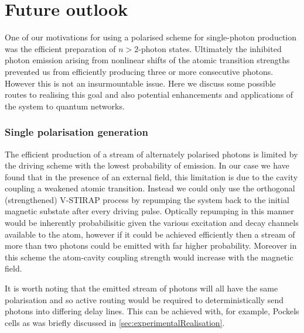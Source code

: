 \documentclass[../Thesis-IJspeert.tex]{subfiles}
\begin{document}
\section{Future outlook}
\label{sec:futureOutlook}

One of our motivations for using a polarised scheme for single-photon production was the efficient preparation of $n{>}2$-photon states.  Ultimately the inhibited photon emission arising from nonlinear shifts of the atomic transition strengths prevented us from efficiently producing three or more consecutive photons.  However this is not an insurmountable issue.  Here we discuss some possible routes to realising this goal and also potential enhancements and applications of the system to quantum networks.

\subsubsection*{Single polarisation generation}

The efficient production of a stream of alternately polarised photons is limited by the driving scheme with the lowest probability of emission.  In our case we have found that in the presence of an external field, this limitation is due to the cavity coupling a weakened atomic transition.  Instead we could only use the orthogonal (strengthened) V-STIRAP process by repumping the system back to the initial magnetic substate after every driving pulse.  Optically repumping in this manner would be inherently probabilisitic given the various excitation and decay channels available to the atom, however if it could be achieved efficiently then a stream of more than two photons could be emitted with far higher probability.  Moreover in this scheme the atom-cavity coupling strength would increase with the magnetic field.

It is worth noting that the emitted stream of photons will all have the same polarisation and so active routing would be required to deterministically send photons into differing delay lines.  This can be achieved with, for example, Pockels cells as was briefly discussed in \cref{sec:experimentalRealisation}.
\end{document}
